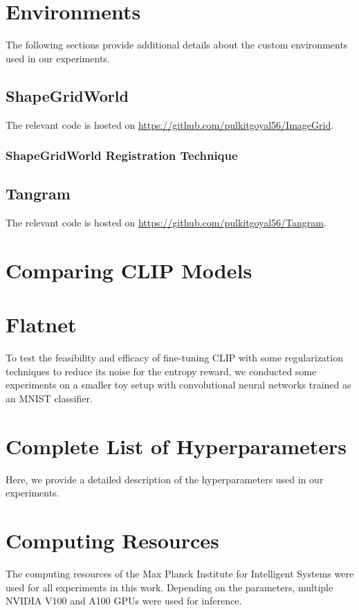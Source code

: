 \chapter{Environments}
The following sections provide additional details about the custom environments used in our experiments.


\section{ShapeGridWorld}
\label{sec:sgw-details}


The relevant code is hosted on \url{https://github.com/pulkitgoyal56/ImageGrid}.

\subsection{ShapeGridWorld Registration Technique}
\label{sec:sgw-registration}



\section{Tangram}
\label{sec:tangram-details}


The relevant code is hosted on \url{https://github.com/pulkitgoyal56/Tangram}.

\chapter{Comparing CLIP Models}
\label{sec:clip-comparison}



\chapter{Flatnet}
\label{sec:flatnet}
To test the feasibility and efficacy of fine-tuning CLIP with some regularization techniques to reduce its noise for the entropy reward, we conducted some experiments on a smaller toy setup with convolutional neural networks trained as an MNIST classifier.


\chapter{Complete List of Hyperparameters}
\label{sec:hyperparameters}
Here, we provide a detailed description of the hyperparameters used in our experiments.


\chapter{Computing Resources}
\label{sec:computing-resources}
The computing resources of the Max Planck Institute for Intelligent Systems were used for all experiments in this work.
Depending on the parameters, multiple NVIDIA V100 and A100 GPUs were used for inference.
